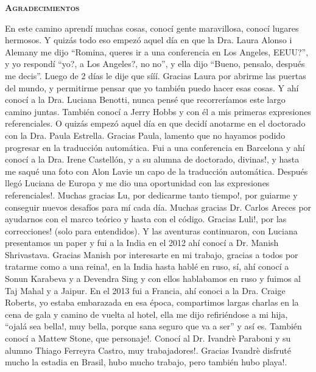 \thispagestyle{empty}


\begin{center}

{ \vspace*{1cm} }
\huge{\textbf{\textsc{\textmd{Agradecimientos}}}}\\[1cm]

\end{center}

\normalsize{

En este camino aprend\'i muchas cosas, conoc\'i gente maravillosa, conoc\'i lugares hermosos. Y quiz\'as todo eso empez\'o aquel d\'ia en que la Dra. Laura Alonso i Alemany me dijo ``Romina, queres ir a una conferencia en Los Angeles, EEUU?'', y yo respond\'i ``yo?, a Los Angeles?, no no'', y ella dijo ``Bueno, pensalo, despu\'es me decis''. Luego de 2 d\'ias le dije que s\'i\'i\'i. Gracias Laura por abrirme las puertas del mundo, y permitirme pensar que yo tambi\'en puedo hacer esas cosas. Y ah\'i conoc\'i a la Dra. Luciana Benotti, nunca pens\'e que recorrer\'iamos este largo camino juntas. Tambi\'en conoc\'i a Jerry Hobbs y con \'el a mis primeras expresiones referenciales. O quiz\'as empez\'o aquel d\'ia en que decid\'i anotarme en el doctorado con la Dra. Paula Estrella. Gracias Paula, lamento que no hayamos podido progresar en la traducci\'on autom\'atica. Fui a una conferencia en Barcelona y ah\'i conoc\'i a la Dra. Irene Castell\'on, y a su alumna de doctorado, divinas!, y hasta me saqu\'e una foto con Alon Lavie un capo de la traducci\'on autom\'atica. Despu\'es lleg\'o Luciana de Europa y me dio una oportunidad con las expresiones referenciales!. Muchas gracias Lu, por dedicarme tanto tiempo!, por guiarme y conseguir nuevos desaf\'ios para m\'i cada d\'ia. Muchas gracias Dr. Carlos Areces por ayudarnos con el marco te\'orico y hasta con el c\'odigo. Gracias Luli!, por las correcciones! (solo para entendidos). Y las aventuras continuaron, con Luciana presentamos un paper y fui a la India en el 2012 ah\'i conoc\'i a Dr. Manish Shrivastava. Gracias Manish por interesarte en mi trabajo, gracias a todos por tratarme como a una reina!, en la India hasta habl\'e en ruso, s\'i, ah\'i conoc\'i a Sonun Karabeva y a Devendra Sing y con ellos hablabamos en ruso y fuimos al Taj Mahal y a Jaipur. En el 2013 fui a Francia, ah\'i conoci a la Dra. Craige Roberts, yo estaba embarazada en esa \'epoca, compartimos largas charlas en la cena de gala y camino de vuelta al hotel, ella me dijo refiri\'endose a mi hija, ``ojal\'a sea bella!, muy bella, porque sana seguro que va a ser'' y as\'i es. Tambi\'en conoc\'i a Mattew Stone, que personaje!. Conoc\'i al Dr. Ivandr\`e Paraboni y su alumno Thiago Ferreyra Castro, muy trabajadores!. Gracias Ivandr\`e disfrut\'e mucho la estadia en Brasil, hubo mucho trabajo, pero tambi\'en hubo playa!.

}
